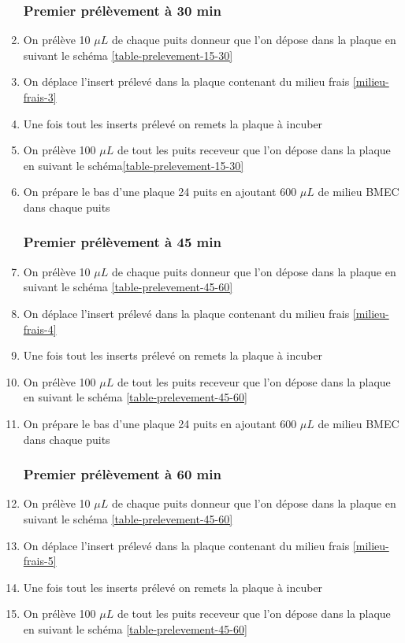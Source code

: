 \begin{enumerate}
\subsubsection{Premier prélèvement à \textbf{30 min}}
\item On prélève 10 $\mu L$ de chaque puits donneur que l'on dépose dans la plaque en suivant le schéma \ref{table-prelevement-15-30}
\item On déplace l'insert prélevé dans la plaque contenant du milieu frais \ref{milieu-frais-3}
\item Une fois tout les inserts prélevé on remets la plaque à incuber
\item On prélève 100 $\mu L$ de tout les puits receveur que l'on dépose dans la plaque en suivant le schéma\ref{table-prelevement-15-30}
\item On prépare le bas d'une plaque 24 puits  en ajoutant 600 $\mu L$ de milieu BMEC dans chaque puits \label{milieu-frais-4}
\subsubsection{Premier prélèvement à \textbf{45 min}}
\item On prélève 10 $\mu L$ de chaque puits donneur que l'on dépose dans la plaque en suivant le schéma \ref{table-prelevement-45-60}
\item On déplace l'insert prélevé dans la plaque contenant du milieu frais \ref{milieu-frais-4}
\item Une fois tout les inserts prélevé on remets la plaque à incuber
\item On prélève 100 $\mu L$ de tout les puits receveur que l'on dépose dans la plaque en suivant le schéma \ref{table-prelevement-45-60}
\item On prépare le bas d'une plaque 24 puits  en ajoutant 600 $\mu L$ de milieu BMEC dans chaque puits \label{milieu-frais-5}
\subsubsection{Premier prélèvement à \textbf{60 min}}
\item On prélève 10 $\mu L$ de chaque puits donneur que l'on dépose dans la plaque en suivant le schéma \ref{table-prelevement-45-60}
\item On déplace l'insert prélevé dans la plaque contenant du milieu frais \ref{milieu-frais-5}
\item Une fois tout les inserts prélevé on remets la plaque à incuber
\item On prélève 100 $\mu L$ de tout les puits receveur que l'on dépose dans la plaque en suivant le schéma \ref{table-prelevement-45-60}


\end{enumerate}
